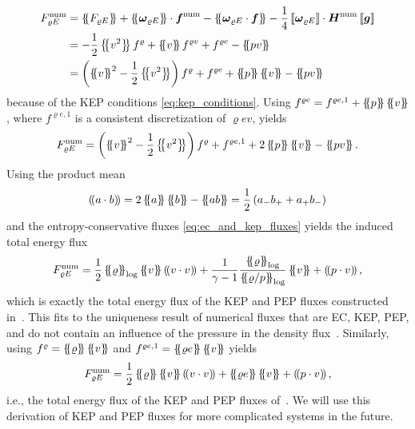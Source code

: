 \documentclass[]{scrartcl}
\newcommand*{\ldblbrace}{\{\mskip-5mu \left \{}
\newcommand*{\rdblbrace}{ \}\mskip-5mu \right \}}
\newcommand{\mean}[1]{\left\ldblbrace #1 \right\rdblbrace}
\newcommand*{\ldblparen}{(\mskip-3mu \left (}
\newcommand*{\rdblparen}{ )\mskip-3mu \right )}
\newcommand{\prodmean}[1]{\left\ldblparen #1 \right\rdblparen}
\renewcommand{\vec}[1]{\boldsymbol{#1}}
\newcommand{\jump}[1]{\left\llbracket #1  \right\rrbracket}
\theoremstyle{definition}
\begin{document}
\begin{equation}
\label{eq:total_energy_flux_from_pressure_and_kep}
\begin{aligned}
    F^\mathrm{num}_{\varrho E}
    &=
    \mean{F_{\varrho E}}
    + \mean{\vec{\omega}_{\varrho E}} \cdot \vec{f}^{\mathrm{num}}
    - \mean{\vec{\omega}_{\varrho E} \cdot \vec{f}}
    - \frac{1}{4} \jump{\vec{\omega}_{\varrho E}} \cdot \vec{H}^\mathrm{num} \jump{\vec{g}}
    \\
    &=
    - \frac{1}{2} \mean{v^2} f^{\varrho}
    + \mean{v} f^{\varrho v}
    + f^{\varrho e}
    - \mean{p v}
    \\
    &=
    \left( \mean{v}^2 - \frac{1}{2} \mean{v^2} \right) f^{\varrho}
    + f^{\varrho e}
    + \mean{p} \mean{v}
    - \mean{p v}
\end{aligned}
\end{equation}
because of the KEP conditions \eqref{eq:kep_conditions}.
Using $f^{\varrho e} = f^{\varrho e, 1} + \mean{p} \mean{v}$, where $f^{\varrho e, 1}$ is a consistent discretization of $\varrho e v$, yields
\begin{equation}
    F^\mathrm{num}_{\varrho E}
    =
    \left( \mean{v}^2 - \frac{1}{2} \mean{v^2} \right) f^{\varrho}
    + f^{\varrho e, 1}
    + 2 \mean{p} \mean{v}
    - \mean{p v}.
\end{equation}
Using the product mean
\begin{equation}
    \prodmean{a \cdot b}
    =
    2 \mean{a} \mean{b} - \mean{ab}
    =
    \frac{1}{2} \left( a_- b_+ + a_+ b_- \right)
\end{equation}
and the entropy-conservative fluxes \eqref{eq:ec_and_kep_fluxes} yields the induced total energy flux
\begin{equation}
    F^\mathrm{num}_{\varrho E}
    =
    \frac{1}{2} \mean{\varrho}_{\log} \mean{v} \prodmean{v \cdot v}
    + \frac{1}{\gamma-1}\frac{\mean{\varrho}_{\log}}{\mean{\varrho/p}_{\log}} \mean{v}
    + \prodmean{p \cdot v},
\end{equation}
which is exactly the total energy flux of the KEP and PEP fluxes constructed in~\cite{Ranocha2020,Ranocha2022}.
This fits to the uniqueness result of numerical fluxes that are EC, KEP, PEP, and do not contain an influence of the pressure in the density flux~\cite[Theorem~1]{Ranocha2022}.
Similarly, using $f^{\varrho} = \mean{\varrho} \mean{v}$ and $f^{\varrho e, 1} = \mean{\varrho e} \mean{v}$ yields
\begin{equation}
    F^\mathrm{num}_{\varrho E}
    =
    \frac{1}{2} \mean{\varrho}\mean{v} \prodmean{v \cdot v}
    + \mean{\varrho e} \mean{v}
    + \prodmean{p \cdot v},
\end{equation}
i.e., the total energy flux of the KEP and PEP fluxes of~\cite{Shima2021}.
We will use this derivation of KEP and PEP fluxes for more complicated systems in the future.
\end{document}
